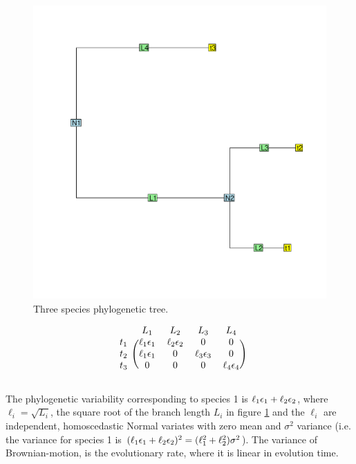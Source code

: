 \documentclass[12pt]{article}
\begin{document}
\begin{center}
\begin{figure}[H]
  \includegraphics[scale=0.8,page=1]{./git_push/tree.pdf}
  \caption{Three species phylogenetic tree.}
\label{fig:tree}
\end{figure}
\end{center}

\[
\begin{blockarray}{ccccc}
 & L_1 & L_2 & L_3 & L_4  \\
\begin{block}{c(cccc)}
  t_1 & \ell_1 \e_1 & \ell_2 \e_2 & 0           & 0 \\
  t_2 & \ell_1 \e_1 &  0          & \ell_3 \e_3 & 0 \\
  t_3 & 0           &  0          & 0           & \ell_4 \e_4 \\
\end{block}
\end{blockarray}
 \]

The phylogenetic variability corresponding to species 1 is $\ell_1 { \epsilon}_1 + \ell_2 { \epsilon}_2$, where $\ell_i = \sqrt{L_i}$, the square root of the branch length $L_i$ in figure \ref{fig:tree} and the $\ell_i$ are independent, homoscedastic Normal variates with zero mean and $\sigma^2$ variance (i.e. the variance for species 1 is $(\ell_1 { \epsilon}_1 + \ell_2 { \epsilon}_2)^2 = (\ell_1^2 + \ell_2^2)\sigma^2$).
The variance of Brownian-motion, is the evolutionary rate, where it is linear in evolution time.
\end{document}
